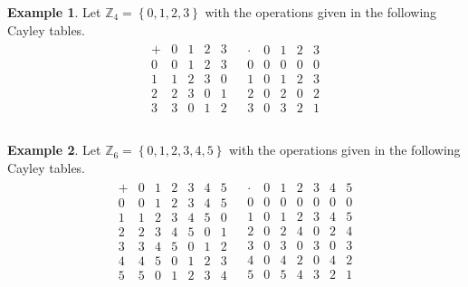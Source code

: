 \documentclass[
]{book}
\theoremstyle{definition}
\theoremstyle{definition}
\newtheorem{example}{Example}[chapter]
\theoremstyle{definition}
\theoremstyle{definition}
\theoremstyle{remark}
\begin{document}
\begin{example}
\protect\hypertarget{exm:z4ring}{}\label{exm:z4ring}Let \(\mathbb{Z}_4=\left\{ 0,1, 2, 3 \right\}\) with the operations given in the following Cayley tables.
\[\begin{array}{cc}
\begin{array}{c|cccc}
+ & 0 & 1 & 2 & 3  \\ \hline
0 & 0 & 1 & 2 & 3 \\
1 & 1 & 2 & 3 & 0 \\
2 & 2 & 3 & 0 & 1 \\
3 & 3 & 0 & 1 & 2 \\
\end{array}
&
\begin{array}{c|cccc}
\cdot & 0 & 1 & 2 & 3 \\ \hline
0 & 0 & 0  & 0 & 0 \\
1 & 0 & 1 & 2 & 3 \\
2 & 0 & 2 & 0 & 2 \\
3 & 0 & 3 & 2 & 1 \\
\end{array}\\
\end{array}\]
\end{example}

\begin{example}
\protect\hypertarget{exm:z6ring}{}\label{exm:z6ring}Let \(\mathbb{Z}_6=\left\{ 0,1, 2, 3, 4, 5 \right\}\) with the operations given in the following Cayley tables.
\[\begin{array}{cc}
\begin{array}{c|cccccc}
+ & 0 & 1 & 2 & 3 & 4 & 5 \\ \hline
0 & 0 & 1 & 2 & 3 & 4 & 5 \\
1 & 1 & 2 & 3 & 4 & 5 & 0\\
2 & 2 & 3 & 4 & 5 & 0 & 1 \\
3 & 3 & 4 & 5 & 0 & 1 & 2 \\
4 & 4 & 5 & 0 & 1 & 2 & 3 \\
5 & 5 & 0 & 1 & 2 & 3 & 4 \\
\end{array}
&
\begin{array}{c|cccccc}
\cdot & 0 & 1 & 2 & 3 & 4 & 5 \\ \hline
0 & 0 & 0  & 0 & 0 & 0 & 0 \\
1 & 0 & 1 & 2 & 3 & 4 & 5\\
2 & 0 & 2 & 4 & 0 & 2 & 4 \\
3 & 0 & 3 & 0 & 3 & 0 & 3 \\
4 & 0 & 4 & 2 & 0 & 4 & 2 \\
5 & 0 & 5 & 4 & 3 & 2 & 1 \\
\end{array}
\end{array}\]
\end{example}
\end{document}
